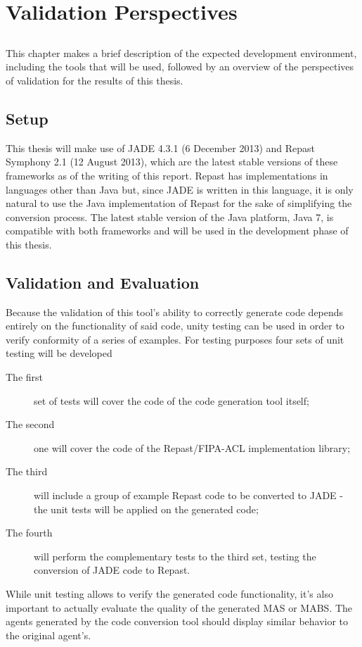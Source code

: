 \chapter{Validation Perspectives} \label{chap:validation}

\section*{}

This chapter makes a brief description of the expected development environment, including the tools that will be used, followed by an overview of the perspectives of validation for the results of this thesis.

\section{Setup}

This thesis will make use of JADE 4.3.1 (6 December 2013) and Repast Symphony 2.1 (12 August 2013), which are the latest stable versions of these frameworks as of the writing of this report. Repast has implementations in languages other than Java but, since JADE is written in this language, it is only natural to use the Java implementation of Repast for the sake of simplifying the conversion process. The latest stable version of the Java platform, Java 7, is compatible with both frameworks and will be used in the development phase of this thesis.

\section{Validation and Evaluation}

Because the validation of this tool's ability to correctly generate code depends entirely on the functionality of said code, unity testing can be used in order to verify conformity of a series of examples. For testing purposes four sets of unit testing will be developed

\begin{description}
  \item[The first] set of tests will cover the code of the code generation tool itself;
  \item[The second] one will cover the code of the Repast/FIPA-ACL implementation library;
  \item[The third] will include a group of example Repast code to be converted to JADE - the unit tests will be applied on the generated code;
  \item[The fourth] will perform the complementary tests to the third set, testing the conversion of JADE code to Repast.
\end{description}

While unit testing allows to verify the generated code functionality, it's also important to actually evaluate the quality of the generated MAS or MABS. The agents generated by the code conversion tool should display similar behavior to the original agent's.
